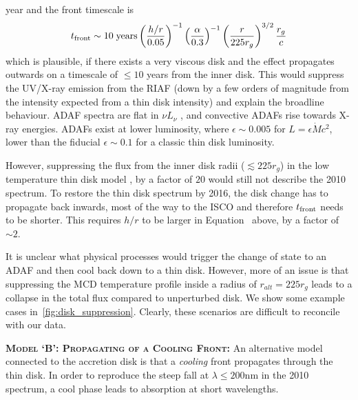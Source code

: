 \documentclass[11pt,a4paper]{article}
\begin{document}
year and the front timescale is
\begin{equation}
    t_{\rm front}  \sim  10 \; {\rm years} \left(\frac{h/r}{0.05}\right)^{-1}
                                                           \left(\frac{\alpha}{0.3}\right)^{-1}  
                                                           \left(\frac{r}{225r_{g}}\right)^{3/2}  
                                                           \frac{r_{g}}{c}
\label{eqn:t_front}
\end{equation}
which is plausible, if there exists a very viscous disk and the effect
propagates outwards on a timescale of $\leq 10$ years from the inner
disk. This would suppress the UV/X-ray emission from the RIAF (down by
a few orders of magnitude from the intensity expected from a thin disk
intensity) and explain the broadline behaviour.  ADAF spectra are flat
in $\nu L_{\nu}$ \citet{Narayan1998, Abramowicz2002, Abramowicz2013},
and convective ADAFs rise towards X-ray energies. ADAFs exist at lower
luminosity, where $\epsilon \sim 0.005$ for $L=\epsilon \dot{M}
c^{2}$, lower than the fiducial $\epsilon \sim 0.1$ for a classic thin
disk luminosity.

However, suppressing the flux from the inner disk radii ($\lesssim 225 r_{g}$)
in the low temperature thin disk model \citep{Narayan1997, Gammie1999,
Agol_Krolik2000, Afshordi_Paczynski2003, Ford2018}, by a factor of
$20$ would still not describe the 2010 spectrum. To restore the thin disk
spectrum by 2016, the disk change has to propagate back inwards, most
of the way to the ISCO and therefore $t_{\rm front}$ needs to be
shorter. This requires $h/r$ to be larger in
Equation~\label{eqn:t_front} above, by a factor of $\sim 2$.

It is unclear what physical processes would trigger the change of
state to an ADAF and then cool back down to a thin disk. However, more
of an issue is that suppressing the MCD temperature profile inside a
radius of $r_{alt} = 225 r_{g}$ leads to a collapse in the total
flux compared to unperturbed disk. We show some example cases
in~\ref{fig:disk_suppression}. Clearly, these scenarios are difficult
to reconcile with our data.





\smallskip \smallskip
\noindent
\textbf{\textsc{Model `B': Propagating of a Cooling Front: }}
An alternative model connected to the accretion disk is that a
\emph{cooling} front propagates through the thin disk.  In order to
reproduce the steep fall at $\lambda \leq 200$nm in the 2010 spectrum,
a cool phase leads to absorption at short wavelengths.
\end{document}

